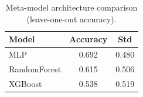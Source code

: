\begin{table}[t]
\centering
\caption{Meta-model architecture comparison (leave-one-out accuracy).}
\label{tab:ablation}
\begin{tabular}{lcc}
\toprule
Model & Accuracy & Std \\
\midrule
MLP & 0.692 & 0.480 \\
RandomForest & 0.615 & 0.506 \\
XGBoost & 0.538 & 0.519 \\
\bottomrule
\end{tabular}
\end{table}